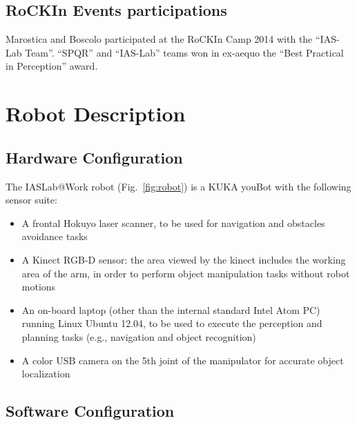 \documentclass[conference]{IEEEtran}
\begin{document}
\subsection{RoCKIn Events participations}
Marostica and Boscolo participated at the RoCKIn Camp 2014 with the ``IAS-Lab Team''. ``SPQR'' and ``IAS-Lab'' teams won in ex-aequo the ``Best Practical in Perception'' award.

\section{Robot Description}

\subsection{Hardware Configuration}

The IASLab@Work robot (Fig.~\ref{fig:robot}) is a KUKA youBot with the following sensor suite:

\begin{itemize}
 \item A frontal Hokuyo laser scanner, to be used for navigation and obstacles avoidance tasks
 \item A Kinect RGB-D sensor: the area viewed by the kinect includes the working area of the arm, in order to perform object manipulation tasks without robot motions
 \item An on-board laptop (other than the internal standard Intel Atom PC) running Linux Ubuntu 12.04, to be used to execute the perception and planning tasks (e.g., navigation and object recognition)
 \item A color USB camera on the 5th joint of the manipulator for accurate object localization
\end{itemize}
 
\subsection{Software Configuration}
\end{document}
